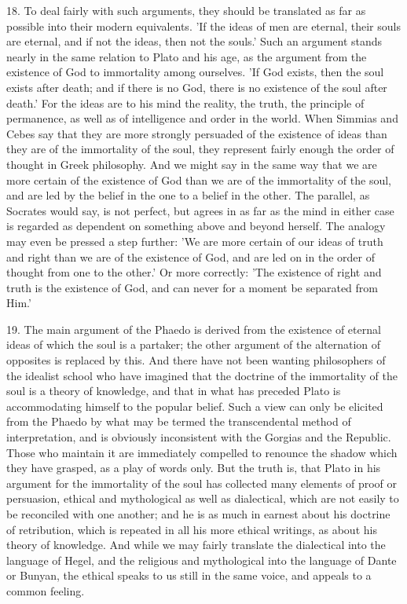 \documentclass[11pt,letter]{article}
\begin{document}
\par  18. To deal fairly with such arguments, they should be translated as far as possible into their modern equivalents. 'If the ideas of men are eternal, their souls are eternal, and if not the ideas, then not the souls.' Such an argument stands nearly in the same relation to Plato and his age, as the argument from the existence of God to immortality among ourselves. 'If God exists, then the soul exists after death; and if there is no God, there is no existence of the soul after death.' For the ideas are to his mind the reality, the truth, the principle of permanence, as well as of intelligence and order in the world. When Simmias and Cebes say that they are more strongly persuaded of the existence of ideas than they are of the immortality of the soul, they represent fairly enough the order of thought in Greek philosophy. And we might say in the same way that we are more certain of the existence of God than we are of the immortality of the soul, and are led by the belief in the one to a belief in the other. The parallel, as Socrates would say, is not perfect, but agrees in as far as the mind in either case is regarded as dependent on something above and beyond herself. The analogy may even be pressed a step further: 'We are more certain of our ideas of truth and right than we are of the existence of God, and are led on in the order of thought from one to the other.' Or more correctly: 'The existence of right and truth is the existence of God, and can never for a moment be separated from Him.'

\par  19. The main argument of the Phaedo is derived from the existence of eternal ideas of which the soul is a partaker; the other argument of the alternation of opposites is replaced by this. And there have not been wanting philosophers of the idealist school who have imagined that the doctrine of the immortality of the soul is a theory of knowledge, and that in what has preceded Plato is accommodating himself to the popular belief. Such a view can only be elicited from the Phaedo by what may be termed the transcendental method of interpretation, and is obviously inconsistent with the Gorgias and the Republic. Those who maintain it are immediately compelled to renounce the shadow which they have grasped, as a play of words only. But the truth is, that Plato in his argument for the immortality of the soul has collected many elements of proof or persuasion, ethical and mythological as well as dialectical, which are not easily to be reconciled with one another; and he is as much in earnest about his doctrine of retribution, which is repeated in all his more ethical writings, as about his theory of knowledge. And while we may fairly translate the dialectical into the language of Hegel, and the religious and mythological into the language of Dante or Bunyan, the ethical speaks to us still in the same voice, and appeals to a common feeling.
\end{document}
